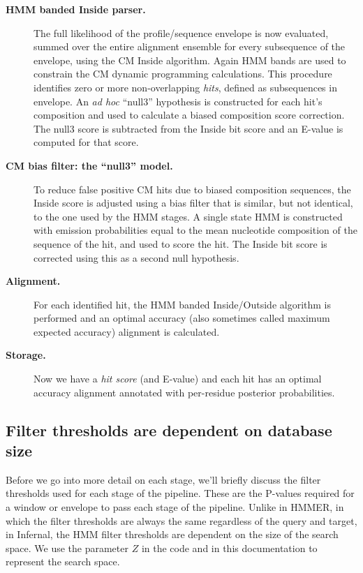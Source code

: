 \begin{description}
\item[\textbf{HMM banded Inside parser.}] The full likelihood of the
  profile/sequence envelope is now evaluated, summed over the entire
  alignment ensemble for every subsequence of the envelope, using the
  CM Inside algorithm. Again HMM bands are used to constrain the
  CM dynamic programming calculations. This procedure identifies zero
  or more non-overlapping \emph{hits}, defined as subsequences in
  envelope. An \emph{ad hoc} ``null3'' hypothesis is constructed for
  each hit's composition and used to calculate a biased composition
  score correction. The null3 score is subtracted from the Inside bit
  score and an E-value is computed for that score.

\item[\textbf{CM bias filter: the ``null3'' model.}]  To reduce false
  positive CM hits due to biased composition sequences, the Inside
  score is adjusted using a bias filter that is similar, but not
  identical, to the one used by the HMM stages. A single state HMM is
  constructed with emission probabilities equal to the mean nucleotide
  composition of the sequence of the hit, and used to score the hit.
  The Inside bit score is corrected using this as a second null
  hypothesis.

\item[\textbf{Alignment.}] For each identified hit, the HMM banded
  Inside/Outside algorithm is performed and an optimal accuracy (also
  sometimes called maximum expected accuracy) alignment is
  calculated. 

\item[\textbf{Storage.}] Now we have a \emph{hit score} (and E-value)
  and each hit has an optimal accuracy alignment annotated with
  per-residue posterior probabilities.

\end{description}

\subsection{Filter thresholds are dependent on database size}
Before we go into more detail on each stage, we'll briefly discuss the
filter thresholds used for each stage of the pipeline. These are the
P-values required for a window or envelope to pass each stage of the
pipeline. Unlike in HMMER, in which the filter thresholds are always
the same regardless of the query and target, in Infernal, the HMM
filter thresholds are dependent on the size of the search space. We
use the parameter $Z$ in the code and in this documentation to
represent the search space.

